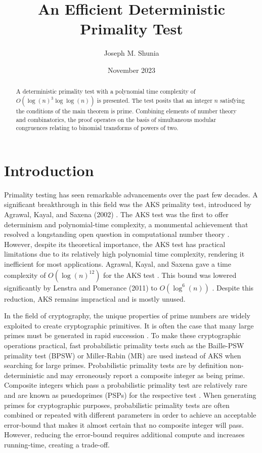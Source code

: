 \documentclass{article}
\title{An Efficient Deterministic Primality Test}
\author{Joseph M. Shunia}
\date{November 2023}
\theoremstyle{plain}
\theoremstyle{definition}
\begin{document}
\maketitle

\begin{abstract}
A deterministic primality test with a polynomial time complexity of $O(\log(n)^3 \log\log(n))$ is presented. The test posits that an integer $n$ satisfying the conditions of the main theorem is prime. Combining elements of number theory and combinatorics, the proof operates on the basis of simultaneous modular congruences relating to binomial transforms of powers of two.
\end{abstract}

\section{Introduction}

Primality testing has seen remarkable advancements over the past few decades. A significant breakthrough in this field was the AKS primality test, introduced by Agrawal, Kayal, and Saxena (2002) \cite{aks2002}. The AKS test was the first to offer determinism and polynomial-time complexity, a monumental achievement that resolved a longstanding open question in computational number theory \cite{goldreich2008}. However, despite its theoretical importance, the AKS test has practical limitations due to its relatively high polynomial time complexity, rendering it inefficient for most applications. Agrawal, Kayal, and Saxena gave a time complexity of $O(\log(n)^{12})$ for the AKS test \cite{aks2002}. This bound was lowered significantly by Lenstra and Pomerance (2011) to $O(\log^6(n))$ \cite{lenstra2011}. Despite this reduction, AKS remains impractical and is mostly unused.

In the field of cryptography, the unique properties of prime numbers are widely exploited to create cryptographic primitives. It is often the case that many large primes must be generated in rapid succession \cite{lenstra1987}. To make these cryptographic operations practical, fast probabilistic primality tests such as the Baille-PSW primality test (BPSW) \cite{baillie1980} or Miller-Rabin (MR) \cite{rabin1980} \cite{miller1976} are used instead of AKS when searching for large primes. Probabilistic primality tests are by definition non-deterministic and may erroneously report a composite integer as being prime. Composite integers which pass a probabilistic primality test are relatively rare and are known as psuedoprimes (PSPs) for the respective test \cite{wagstaff1983}. When generating primes for cryptographic purposes, probabilistic primality tests are often combined or repeated with different parameters in order to achieve an acceptable error-bound that makes it almost certain that no composite integer will pass. However, reducing the error-bound requires additional compute and increases running-time, creating a trade-off.
\end{document}
